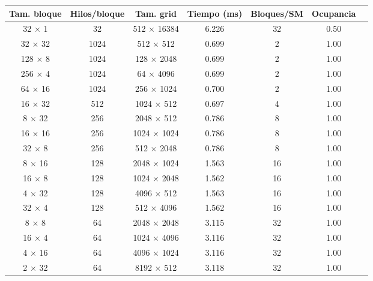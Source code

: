     \begin{table}[H]
        \centering
        \begin{adjustbox}{width=\textwidth, keepaspectratio}
            \begin{tabular}{ccccccc}
                \toprule
                \textbf{Tam. bloque} & \textbf{Hilos/bloque} & \textbf{Tam. grid} & \textbf{Tiempo (ms)} & \textbf{Bloques/SM} & \textbf{Ocupancia} \\
                \midrule
                32 $\times$ 1   & 32   & 512 $\times$ 16384  & 6.226  & 32  & 0.50 \\
                32 $\times$ 32  & 1024 & 512 $\times$ 512    & 0.699  & 2   & 1.00 \\
                128 $\times$ 8  & 1024 & 128 $\times$ 2048   & 0.699  & 2   & 1.00 \\
                256 $\times$ 4  & 1024 & 64 $\times$ 4096    & 0.699  & 2   & 1.00 \\
                64 $\times$ 16  & 1024 & 256 $\times$ 1024   & 0.700  & 2   & 1.00 \\
                16 $\times$ 32  & 512  & 1024 $\times$ 512   & 0.697  & 4   & 1.00 \\
                8 $\times$ 32   & 256  & 2048 $\times$ 512   & 0.786  & 8   & 1.00 \\
                16 $\times$ 16  & 256  & 1024 $\times$ 1024  & 0.786  & 8   & 1.00 \\
                32 $\times$ 8   & 256  & 512 $\times$ 2048   & 0.786  & 8   & 1.00 \\
                8 $\times$ 16   & 128  & 2048 $\times$ 1024  & 1.563  & 16  & 1.00 \\
                16 $\times$ 8   & 128  & 1024 $\times$ 2048  & 1.562  & 16  & 1.00 \\
                4 $\times$ 32   & 128  & 4096 $\times$ 512   & 1.563  & 16  & 1.00 \\
                32 $\times$ 4   & 128  & 512 $\times$ 4096   & 1.562  & 16  & 1.00 \\
                8 $\times$ 8    & 64   & 2048 $\times$ 2048  & 3.115  & 32  & 1.00 \\
                16 $\times$ 4   & 64   & 1024 $\times$ 4096  & 3.116  & 32  & 1.00 \\
                4 $\times$ 16   & 64   & 4096 $\times$ 1024  & 3.116  & 32  & 1.00 \\
                2 $\times$ 32   & 64   & 8192 $\times$ 512   & 3.118  & 32  & 1.00 \\

\end{tabular}
\end{adjustbox}
\end{table}
